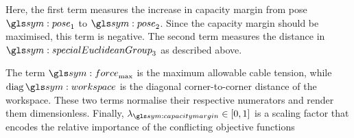 		Here, the first term measures the increase in capacity margin from pose
		$\pose_1$ to $\pose_2$. Since the capacity margin should be maximised,
		this term is negative. The second term measures the distance in
		$\specialEuclideanGroup{3}$ as described above.

		The term $\force_{\max}$ is the maximum allowable cable tension, while
		$\diag{\workspace}$ is the diagonal corner-to-corner distance of the
		workspace. These two terms normalise their respective numerators and
		render them dimensionless. Finally, $\lambda_{\capacitymargin} \in [0,
		1]$ is a scaling factor that encodes the relative importance of the
		conflicting objective functions
